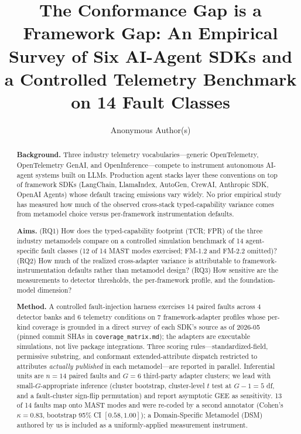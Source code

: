 \documentclass[a4paper,UKenglish,cleveref,autoref,thm-restate]{lipics-v2021}
\title{The Conformance Gap is a Framework Gap: An Empirical Survey of Six AI-Agent SDKs and a Controlled Telemetry Benchmark on 14 Fault Classes}
\author{Anonymous Author(s)}{Anonymous Institution}{}{}{}
\begin{document}
\maketitle

\begin{abstract}
\noindent\textbf{Background.} Three industry telemetry vocabularies---generic
OpenTelemetry, OpenTelemetry GenAI, and OpenInference---compete to
instrument autonomous AI-agent systems built on LLMs.  Production
agent stacks layer these conventions on top of framework SDKs
(LangChain, LlamaIndex, AutoGen, CrewAI, Anthropic SDK, OpenAI Agents)
whose default tracing emissions vary widely.  No prior empirical
study has measured how much of the observed cross-stack typed-capability
variance comes from metamodel choice versus per-framework
instrumentation defaults.

\noindent\textbf{Aims.} (RQ1) How does the typed-capability footprint
(TCR; FPR) of the three industry metamodels compare on a controlled
simulation benchmark of 14 agent-specific fault classes (12 of 14
MAST modes exercised; FM-1.2 and FM-2.2 omitted)? (RQ2) How much of
the realized cross-adapter variance is attributable to
framework-instrumentation defaults rather than metamodel design?
(RQ3) How sensitive are the measurements to detector thresholds, the
per-framework profile, and the foundation-model dimension?

\noindent\textbf{Method.} A controlled fault-injection harness
exercises 14 paired faults across 4 detector banks and 6 telemetry
conditions on 7 framework-adapter profiles whose per-kind coverage is
grounded in a direct survey of each SDK's source as of 2026-05
(pinned commit SHAs in \texttt{coverage\_matrix.md}); the adapters
are executable simulations, not live package integrations. Three
scoring rules---standardized-field, permissive substring, and
conformant extended-attribute dispatch restricted to attributes
\emph{actually published} in each metamodel---are reported in
parallel. Inferential units are $n = 14$ paired faults and $G = 6$
third-party adapter clusters; we lead with small-$G$-appropriate
inference (cluster bootstrap, cluster-level $t$ test at $G - 1 = 5$ df, and a
fault-cluster sign-flip permutation) and report asymptotic GEE as
sensitivity. 13 of 14 faults map
onto MAST modes \cite{anon-mast} and were re-coded by a second
annotator (Cohen's $\kappa = 0.83$, bootstrap 95\% CI $[0.58, 1.00]$);
a Domain-Specific Metamodel (DSM) authored by us is included as a
uniformly-applied measurement instrument.


\end{abstract}
\end{document}
